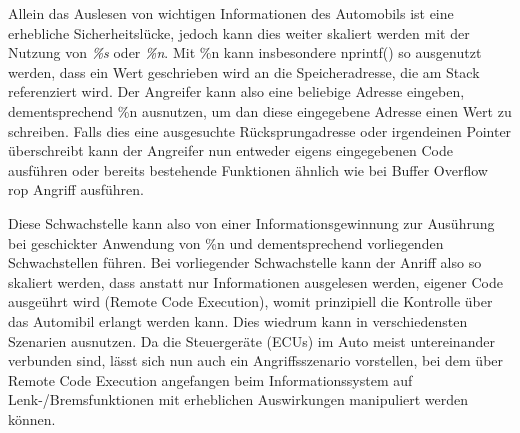 \documentclass[a4paper,
DIV=13,
12pt,
BCOR=10mm,
department=FakIM,
oneside,
parskip=half,
automark,
listof=totocnumbered,
bibliography=totocnumbered,
acronym=totocnumbered
] {OTHRartcl}
\begin{document}
Allein das Auslesen von wichtigen Informationen des Automobils ist eine erhebliche Sicherheitslücke, jedoch kann dies weiter skaliert werden mit der Nutzung von \textit{\%s} oder \textit{\%n}.
Mit \%n kann insbesondere nprintf() so ausgenutzt werden, dass ein Wert geschrieben wird an die Speicheradresse, die am Stack referenziert wird.
Der Angreifer kann also eine beliebige Adresse eingeben, dementsprechend \%n ausnutzen, um dan diese eingegebene Adresse einen Wert zu schreiben.
Falls dies eine ausgesuchte Rücksprungadresse oder irgendeinen Pointer überschreibt kann der Angreifer nun entweder eigens eingegebenen Code ausführen oder bereits bestehende Funktionen
ähnlich wie bei Buffer Overflow \ac{rop} Angriff ausführen.

Diese Schwachstelle kann also von einer Informationsgewinnung zur Ausührung  bei geschickter Anwendung von \%n und dementsprechend vorliegenden Schwachstellen führen.
Bei vorliegender Schwachstelle kann der Anriff also so skaliert werden, dass anstatt nur Informationen ausgelesen werden, eigener Code ausgeührt wird (Remote Code Execution),
womit prinzipiell die Kontrolle über das Automibil erlangt werden kann. Dies wiedrum kann in verschiedensten Szenarien ausnutzen.
Da die Steuergeräte (ECUs) im Auto meist untereinander verbunden sind, lässt sich nun auch ein Angriffsszenario vorstellen, bei dem über Remote Code Execution angefangen beim
Informationssystem auf Lenk-/Bremsfunktionen mit erheblichen Auswirkungen manipuliert werden können.

\end{document}
